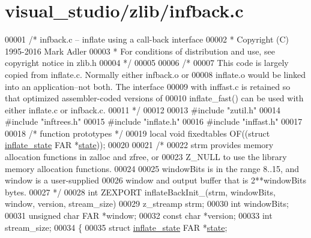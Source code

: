 \hypertarget{visual__studio_2zlib_2infback_8c_source}{}\section{visual\+\_\+studio/zlib/infback.c}
\label{visual__studio_2zlib_2infback_8c_source}

\begin{DoxyCode}
00001 \textcolor{comment}{/* infback.c -- inflate using a call-back interface}
00002 \textcolor{comment}{ * Copyright (C) 1995-2016 Mark Adler}
00003 \textcolor{comment}{ * For conditions of distribution and use, see copyright notice in zlib.h}
00004 \textcolor{comment}{ */}
00005 
00006 \textcolor{comment}{/*}
00007 \textcolor{comment}{   This code is largely copied from inflate.c.  Normally either infback.o or}
00008 \textcolor{comment}{   inflate.o would be linked into an application--not both.  The interface}
00009 \textcolor{comment}{   with inffast.c is retained so that optimized assembler-coded versions of}
00010 \textcolor{comment}{   inflate\_fast() can be used with either inflate.c or infback.c.}
00011 \textcolor{comment}{ */}
00012 
00013 \textcolor{preprocessor}{#include "zutil.h"}
00014 \textcolor{preprocessor}{#include "inftrees.h"}
00015 \textcolor{preprocessor}{#include "inflate.h"}
00016 \textcolor{preprocessor}{#include "inffast.h"}
00017 
00018 \textcolor{comment}{/* function prototypes */}
00019 local \textcolor{keywordtype}{void} fixedtables OF((\textcolor{keyword}{struct} \hyperlink{structinflate__state}{inflate\_state} FAR *\hyperlink{structstate}{state}));
00020 
00021 \textcolor{comment}{/*}
00022 \textcolor{comment}{   strm provides memory allocation functions in zalloc and zfree, or}
00023 \textcolor{comment}{   Z\_NULL to use the library memory allocation functions.}
00024 \textcolor{comment}{}
00025 \textcolor{comment}{   windowBits is in the range 8..15, and window is a user-supplied}
00026 \textcolor{comment}{   window and output buffer that is 2**windowBits bytes.}
00027 \textcolor{comment}{ */}
00028 \textcolor{keywordtype}{int} ZEXPORT inflateBackInit\_(strm, windowBits, window, version, stream\_size)
00029 z\_streamp strm;
00030 \textcolor{keywordtype}{int} windowBits;
00031 \textcolor{keywordtype}{unsigned} \textcolor{keywordtype}{char} FAR *window;
00032 \textcolor{keyword}{const} \textcolor{keywordtype}{char} *version;
00033 \textcolor{keywordtype}{int} stream\_size;
00034 \{
00035     \textcolor{keyword}{struct }\hyperlink{structinflate__state}{inflate\_state} FAR *\hyperlink{structstate}{state};

\end{DoxyCode}
